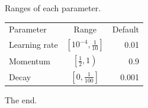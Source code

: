 \documentclass{article}
\begin{document}
Ranges of each parameter.

\begin{tabular}{lcr}
Parameter & Range & Default \\
Learning rate & $\left[10^{-4}, \frac{1}{10}\right]$ & 0.01 \\
Momentum & $\left[\frac{1}{2}, 1\right)$ & 0.9 \\
Decay & $\left[0, \frac{1}{100}\right]$ & 0.001 \\
\end{tabular}

The end.
\end{document}
